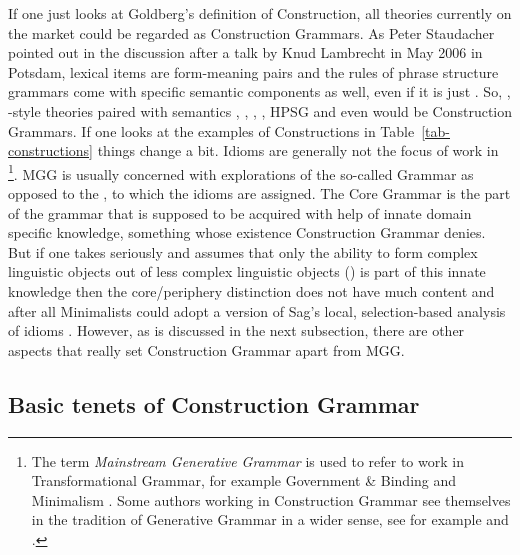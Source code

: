 \documentclass[output=paper]{langsci/langscibook}
\begin{document}
If one just looks at Goldberg's definition of Construction, all theories currently on the market could be
regarded as Construction Grammars. As Peter Staudacher pointed out in the discussion after a talk by
Knud Lambrecht in May 2006 in Potsdam, lexical items are form-meaning pairs and the rules of
phrase structure grammars come with specific semantic components as well, even if it is just
.
So, \cg, -style theories paired with semantics \citep{HK98a-u}, \gpsg, \treeag,
\lfg, HPSG and even \minimalism would be Construction Grammars. If one looks at the
examples of Constructions in Table~\ref{tab-constructions} things change a bit. Idioms are generally
not the focus of work in \footnote{
  The term \emph{Mainstream Generative Grammar} is used to refer to work in Transformational
  Grammar, for example Government \& Binding \citep{Chomsky81a} and Minimalism
  \citep{Chomsky95a-u}. Some authors working in Construction Grammar see themselves in the tradition of
  Generative Grammar in a wider sense, see for example  and .%
}. MGG is usually concerned with explorations of the so-called  Grammar as opposed to the , to which the
idioms are assigned.
The Core Grammar is the part of the grammar that is supposed to be acquired with
help of innate domain specific knowledge, something whose existence Construction Grammar
denies. But if one takes \citet*{HCF2002a} seriously and assumes that only the ability to form complex
linguistic objects out of less complex linguistic objects () is part of this innate knowledge
then the core/periphery distinction does not have much content and after all Minimalists could adopt
a version of Sag's local, selection-based analysis of idioms \parencites{Sag2007a}{KSF2015a}{KM2017a}.
However, as is discussed in the next subsection, there are other aspects that really set Construction Grammar apart from
MGG.

\subsection{Basic tenets of Construction Grammar}
\label{sec-tenets}
\end{document}
